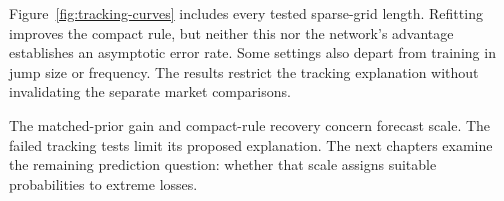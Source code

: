 Figure~\ref{fig:tracking-curves} includes every tested sparse-grid length. Refitting improves the compact rule, but neither this nor the network's advantage establishes an asymptotic error rate. Some settings also depart from training in jump size or frequency. The results restrict the tracking explanation without invalidating the separate market comparisons.

The matched-prior gain and compact-rule recovery concern forecast scale. The failed tracking tests limit its proposed explanation. The next chapters examine the remaining prediction question: whether that scale assigns suitable probabilities to extreme losses.
